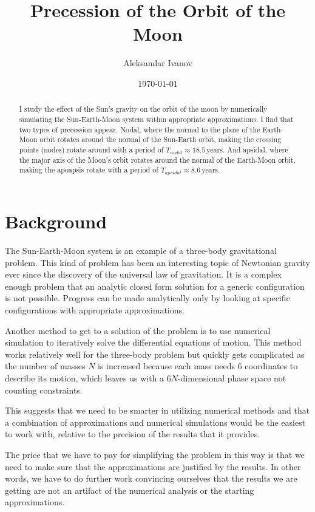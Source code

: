 \documentclass[12pt,a4paper]{article}
\begin{document}
\title{Precession of the Orbit of the Moon}
\author{Aleksandar Ivanov}
\date{\today}
\maketitle

\begin{abstract}
I study the effect of the Sun's gravity on the orbit of the moon by numerically simulating the Sun-Earth-Moon system within appropriate approximations. I find that two types of precession appear. Nodal, where the normal to the plane of the Earth-Moon orbit rotates around the normal of the Sun-Earth orbit, making the crossing points (nodes) rotate around with a period of $T_{nodal} \approx 18.5 \, \mathrm{years}$. And apsidal, where the major axis of the Moon's orbit rotates around the normal of the Earth-Moon orbit, making the apoapsis rotate with a period of $T_{apsidal} \approx 8.6 \, \mathrm{years}$.
\end{abstract}


\section{Background}

The Sun-Earth-Moon system is an example of a three-body gravitational problem. This kind of problem has been an interesting topic of Newtonian gravity ever since the discovery of the universal law of gravitation. It is a complex enough problem that an analytic closed form solution for a generic configuration is not possible. Progress can be made analytically only by looking at specific configurations with appropriate approximations. \cite{srbisols}

Another method to get to a solution of the problem is to use numerical simulation to iteratively solve the differential equations of motion. This method works relatively well for the three-body problem but quickly gets complicated as the number of masses $N$ is increased because each mass needs $6$ coordinates to describe its motion, which leaves us with a $6N$-dimensional phase space not counting constraints.

This suggests that we need to be smarter in utilizing numerical methods and that a combination of approximations and numerical simulations would be the easiest to work with, relative to the precision of the results that it provides.

The price that we have to pay for simplifying the problem in this way is that we need to make sure that the approximations are justified by the results. In other words, we have to do further work convincing ourselves that the results we are getting are not an artifact of the numerical analysis or the starting approximations.
\end{document}
